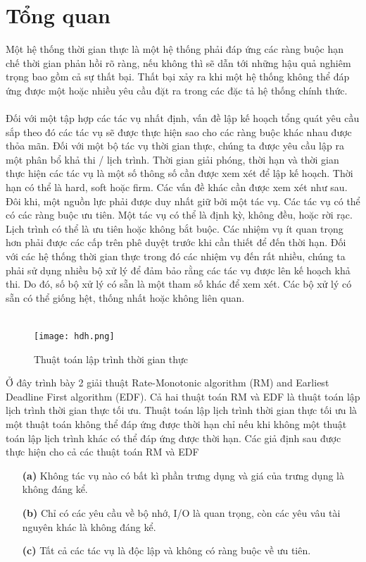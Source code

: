 \documentclass[a4paper,10pt]{report}
\begin{document}
\section{Tổng quan}
Một hệ thống thời gian thực là một hệ thống phải đáp ứng các ràng buộc hạn chế thời gian phản hồi rõ ràng, nếu không thì sẽ dẫn tới những hậu quả nghiêm trọng bao gồm cả sự thất bại. Thất bại xảy ra khi một hệ thống không thể đáp ứng được một hoặc nhiều yêu cầu đặt ra trong các đặc tả hệ thống chính thức. \\ \\
Đối với một tập hợp các tác vụ nhất định, vấn đề lập kế hoạch tổng quát yêu cầu sắp theo đó các tác vụ sẽ được thực hiện sao cho các ràng buộc khác nhau được thỏa mãn. Đối với một bộ tác vụ thời gian thực, chúng ta được yêu cầu lập ra một phân bổ khả thi / lịch trình. Thời gian giải phóng, thời hạn và thời gian thực hiện các tác vụ là một số thông số cần được xem xét để lập kế hoạch. Thời hạn có thể là hard, soft hoặc firm. Các vấn đề khác cần được xem xét như sau. Đôi khi, một nguồn lực phải được duy nhất giữ bởi một tác vụ. Các tác vụ có thể có các ràng buộc ưu tiên. Một tác vụ có thể là định kỳ, không đều, hoặc rời rạc. Lịch trình có thể là ưu tiên hoặc không bắt buộc. Các nhiệm vụ ít quan trọng hơn phải được các cấp trên phê duyệt trước khi cần thiết để đến thời hạn. Đối với các hệ thống thời gian thực trong đó các nhiệm vụ đến rất nhiều, chúng ta phải sử dụng nhiều bộ xử lý để đảm bảo rằng các tác vụ được lên kế hoạch khả thi. Do đó, số bộ xử lý có sẵn là một tham số khác để xem xét. Các bộ xử lý có sẵn có thể giống hệt, thống nhất hoặc không liên quan.\\ \\
\begin{figure}[h]
\begin{center}
\texttt{[image: hdh.png]}
\caption{Thuật toán lập trình thời gian thực}
\end{center}
\end{figure} 
\newpage
Ở đây trình bày 2 giải thuật Rate-Monotonic algorithm (RM) and Earliest Deadline First algorithm (EDF). Cả hai thuật toán RM và EDF là thuật toán lập lịch trình thời gian thực tối ưu. Thuật toán lập lịch trình thời gian thực tối ưu là một thuật toán không thể đáp ứng được thời hạn chỉ nếu khi không một thuật toán lập lịch trình khác có thể đáp ứng được thời hạn. Các giả định sau được thực hiện cho cả các thuật toán RM và EDF
\begin{itemize}
\item[\textbf{(a)}] Không tác vụ nào có bất kì phần trưng dụng và giá của trưng dụng là không đáng kể.
\item[\textbf{(b)}] Chỉ có các yêu cầu về bộ nhớ, I/O là quan trọng, còn các yêu vâu tài nguyên khác  là không đáng kể.
\item[\textbf{(c)}] Tất cả các tác vụ là độc lập và không có ràng buộc về ưu tiên.
\end{itemize}
\end{document}
